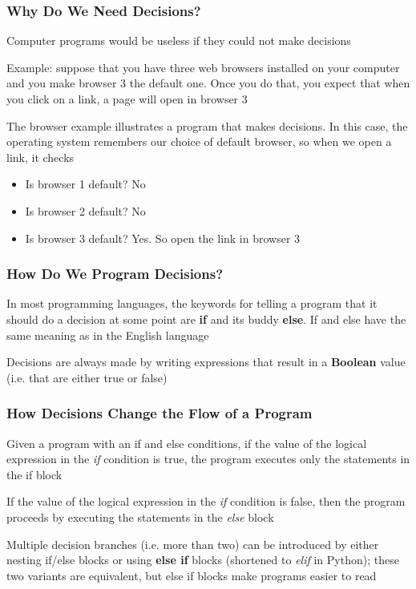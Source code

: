 \documentclass{beamer}
\begin{document}
\begin{frame}
\frametitle{Why Do We Need Decisions?}
    Computer programs would be useless if they could not make decisions
    \newline

    Example: suppose that you have three web browsers installed on your computer and you make browser 3 the default one. Once you do that, you expect that when you click on a link, a page will open in browser 3
    \newline

    The browser example illustrates a program that makes decisions. In this case, the operating system remembers our choice of default browser, so when we open a link, it checks
    \begin{itemize}
        \item Is browser 1 default? No
        \item Is browser 2 default? No
        \item Is browser 3 default? Yes. So open the link in browser 3
    \end{itemize}
\end{frame}

\begin{frame}
\frametitle{How Do We Program Decisions?}
    In most programming languages, the keywords for telling a program that it should do a decision at some point are \textbf{if} and its buddy \textbf{else}. If and else have the same meaning as in the English language
    \newline

    Decisions are always made by writing expressions that result in a \textbf{Boolean} value (i.e. that are either true or false)
    \vspace{0.25cm}
    
\end{frame}

\begin{frame}
\frametitle{How Decisions Change the Flow of a Program}
    Given a program with an if and else conditions, if the value of the logical expression in the \emph{if} condition is true, the program executes only the statements in the if block
    \newline

    If the value of the logical expression in the \emph{if} condition is false, then the program proceeds by executing the statements in the \emph{else} block
    \newline

    Multiple decision branches (i.e. more than two) can be introduced by either nesting if/else blocks or using \textbf{else if} blocks (shortened to \emph{elif} in Python); these two variants are equivalent, but else if blocks make programs easier to read
\end{frame}
\end{document}
